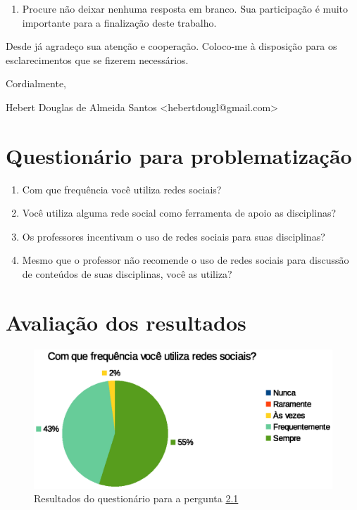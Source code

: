 \begin{apendicesenv}
\begin{enumerate}
\item Procure não deixar nenhuma resposta em branco. Sua participação é muito importante para a finalização deste trabalho.
\end{enumerate}

Desde já agradeço sua atenção e cooperação. Coloco-me à disposição para os esclarecimentos que se fizerem necessários.

Cordialmente,
\begin{description}
\item Hebert Douglas de Almeida Santos <hebertdougl@gmail.com>
\end{description}

\chapter{Questionário para problematização}
\label{apen-quest}

\begin{enumerate}

\item \label{pergunta1} Com que frequência você utiliza redes sociais?

\item \label{pergunta2} Você utiliza alguma rede social como ferramenta de apoio as disciplinas?

\item \label{pergunta3} Os professores incentivam o uso de redes sociais para suas disciplinas?

\item \label{pergunta4} Mesmo que o professor não recomende o uso de redes sociais para discussão de conteúdos de suas disciplinas, você as utiliza?

\end{enumerate}


\chapter{Avaliação dos resultados}
\label{apen-quest-result}

\begin{figure}[h]
    \centering
    \includegraphics[keepaspectratio=true,scale=0.55]
      {figuras/pergunta1p.eps}
    \caption{Resultados do questionário para a pergunta \ref{pergunta1}}
    \label{pergunta1}
\end{figure}


\end{apendicesenv}
